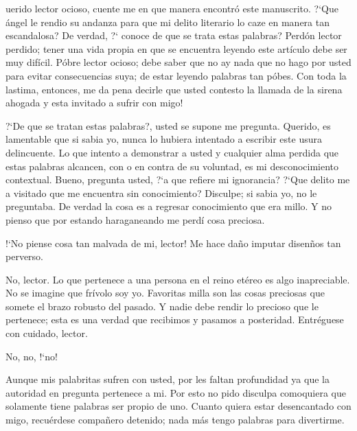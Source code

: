 \documentclass[12pt]{article}
\begin{document}
	\begin{multicols}{2}
		uerido lector ocioso, cuente me en que manera encontr\'{o} este manuscrito. \mbox{?`}Que \'{a}ngel le rendio su andanza para que mi delito literario lo caze en manera tan escandalosa? De verdad, \mbox{?`} conoce de que se trata estas palabras? Perd\'{o}n lector perdido; tener una vida propia en que se encuentra leyendo este art\'{i}culo debe ser muy difícil. P\'{o}bre lector ocioso; debe saber que no ay nada que no hago por usted para evitar consecuencias suya; de estar leyendo palabras tan p\'{o}bes. Con toda la lastima, entonces, me da pena decirle que usted contesto la llamada de la sirena ahogada y esta invitado a sufrir con migo!
		
		\mbox{?`}De que se tratan estas palabras?, usted se supone me pregunta. Querido, es lamentable que si sabia yo, nunca lo hubiera intentado a escribir este usura delincuente. Lo que intento a demonstrar a usted y cualquier alma perdida que estas palabras alcancen, con o en contra de su voluntad, es mi desconocimiento contextual. Bueno, pregunta usted, \mbox{?`}a que refiere mi ignorancia? \mbox{?`}Que delito me a visitado que me encuentra sin conocimiento? Disculpe; si sabia yo, no le preguntaba. De verdad la cosa es a regresar conocimiento que era millo. Y no pienso que por estando haraganeando me perd\'{i} cosa preciosa.
		
		\mbox{!`}No piense cosa tan malvada de mi, lector! Me hace da\~{n}o imputar disen\~{n}os tan perverso.
		
		No, lector. Lo que pertenece a una persona en el reino etéreo es algo inapreciable. No se imagine que fr\'{i}volo soy yo. Favoritas milla son las cosas preciosas que somete el brazo robusto del pasado. Y nadie debe rendir lo precioso que le pertenece; esta es una verdad que recibimos y pasamos a posteridad. Entr\'{e}guese con cuidado, lector.
		
		No, no, \mbox{!`}no!
		
		Aunque mis palabritas sufren con usted, por les faltan profundidad ya que la autoridad en pregunta pertenece a mi.  Por esto no pido disculpa comoquiera que solamente tiene palabras ser propio de uno. Cuanto quiera estar desencantado con migo, recu\'{e}rdese compa\~{n}ero detenido; nada m\'{a}s tengo palabras para divertirme.
	\end{multicols}
	
	
	
\end{document}
